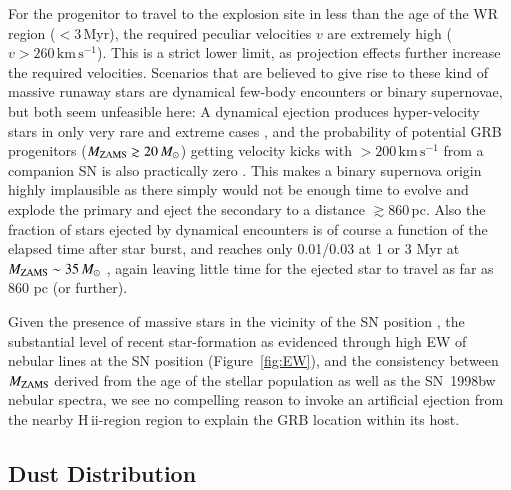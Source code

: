\documentclass[traditabstract]{aa}
\newcommand{\hii}{\mbox{H\,{\sc ii}}}
\begin{document}
For the progenitor to travel to the explosion site in less than the age of the WR region ($<3$\,Myr), the required peculiar velocities $v$ are extremely high ($v>260\,\mathrm{km\,s^{-1}}$). This is a strict lower limit, as projection effects further increase the required velocities. Scenarios that are believed to give rise to these kind of massive runaway stars are dynamical few-body encounters or binary supernovae, but both seem unfeasible here: A dynamical ejection produces hyper-velocity stars in only very rare and extreme cases \citep{2001A&A...365...49H, 2012ApJ...751..133P}, and the probability of potential GRB progenitors ($M_{\rm{ZAMS}}\gtrsim 20\,M_\odot$) getting velocity kicks with $>200\,\mathrm{km\,s^{-1}}$ from a companion SN is also practically zero \citep{2011MNRAS.414.3501E}. This makes a binary supernova origin highly implausible as there simply would not be enough time to evolve and explode the primary and eject the secondary to a distance $\gtrsim860$\,pc. Also the fraction of stars ejected by dynamical encounters is of course a function of the elapsed time after star burst, and reaches only 0.01/0.03 at 1 or 3 Myr at $M_{\rm{ZAMS}}\sim 35\,M_\odot$ \citep{2012ApJ...746...15B}, again leaving little time for the ejected star to travel as far as 860 pc (or further).

Given the presence of massive stars in the vicinity of the SN position \citep{2000ApJ...542L..89F}, the substantial level of recent star-formation as evidenced through high EW of nebular lines at the SN position (Figure~\ref{fig:EW}), and the consistency between $M_{\rm{ZAMS}}$ derived from the age of the stellar population as well as the SN~1998bw nebular spectra, we see no compelling reason to invoke an artificial ejection from the nearby \hii-region region to explain the GRB location within its host.

\subsection{Dust Distribution}
\end{document}
